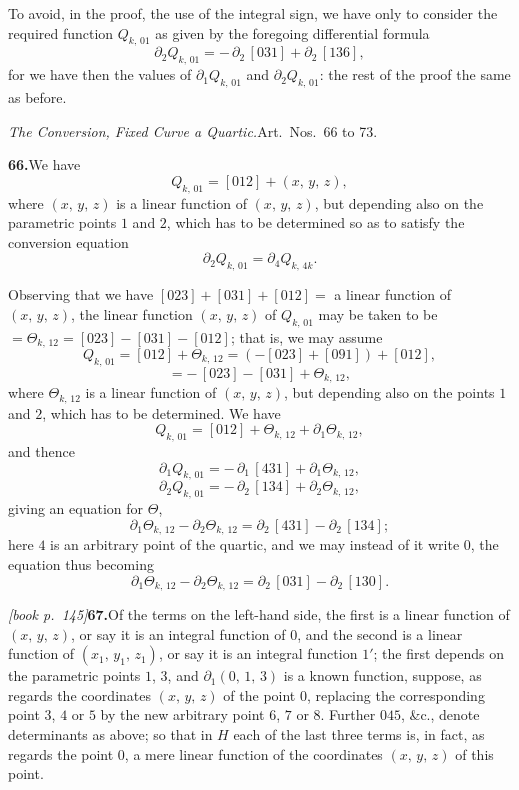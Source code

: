 \documentclass[11pt,a4paper]{article}
\theoremstyle{plain}
\theoremstyle{definition}
\theoremstyle{remark}
\begin{document}
To avoid, in the proof, the use of the integral sign, we have only to consider the required function $Q_{k,\,01}$ as given by the foregoing differential formula
\[
\partial_2 Q_{k,\,01} = -\,\partial_2\,[031] + \partial_2\,[136],
\]
for we have then the values of $\partial_1 Q_{k,\,01}$ and $\partial_2 Q_{k,\,01}$: the rest of the proof the same as before.

\medskip\noindent\textit{The Conversion, Fixed Curve a Quartic.}\quad Art.\ Nos.\ 66 to 73.

\medskip\noindent\textbf{66.}\quad We have
\[
Q_{k,\,01} = [012] + (x,\,y,\,z),
\]
where $(x,\,y,\,z)$ is a linear function of $(x,\,y,\,z)$, but depending also on the parametric points $1$ and $2$, which has to be determined so as to satisfy the conversion equation
\[
\partial_2 Q_{k,\,01} = \partial_4 Q_{k,\,4k}.
\]

Observing that we have $[023] + [031] + [012] = $ a linear function of $(x,\,y,\,z)$, the linear function $(x,\,y,\,z)$ of $Q_{k,\,01}$ may be taken to be $= \Theta_{k,\,12} = [023] - [031] - [012]$; that is, we may assume
\[
Q_{k,\,01} = [012] + \Theta_{k,\,12} = (-[023] + [091]) + [012],
\]
\[
= -\,[023] - [031] + \Theta_{k,\,12},
\]
where $\Theta_{k,\,12}$ is a linear function of $(x,\,y,\,z)$, but depending also on the points $1$ and $2$, which has to be determined. We have
\[
Q_{k,\,01} = [012] + \Theta_{k,\,12} + \partial_1\Theta_{k,\,12},
\]
and thence
\[
\partial_1 Q_{k,\,01} = -\,\partial_1\,[431] + \partial_1\Theta_{k,\,12},
\]
\[
\partial_2 Q_{k,\,01} = -\,\partial_2\,[134] + \partial_2\Theta_{k,\,12},
\]
giving an equation for $\Theta$,
\[
\partial_1\Theta_{k,\,12} - \partial_2\Theta_{k,\,12} = \partial_2\,[431] - \partial_2\,[134];
\]
here $4$ is an arbitrary point of the quartic, and we may instead of it write $0$, the equation thus becoming
\[
\partial_1\Theta_{k,\,12} - \partial_2\Theta_{k,\,12} = \partial_2\,[031] - \partial_2\,[130].
\]

\medskip\noindent\textit{[book p.~145]}\quad \textbf{67.}\quad Of the terms on the left-hand side, the first is a linear function of $(x,\,y,\,z)$, or say it is an integral function of $0$, and the second is a linear function of $(x_1,\,y_1,\,z_1)$, or say it is an integral function $1'$; the first depends on the parametric points $1$, $3$, and $\partial_1(0,\,1,\,3)$ is a known function, suppose, as regards the coordinates $(x,\,y,\,z)$ of the point $0$, replacing the corresponding point $3$, $4$ or $5$ by the new arbitrary point $6$, $7$ or $8$. Further $045$, \&c., denote determinants as above; so that in $H$ each of the last three terms is, in fact, as regards the point $0$, a mere linear function of the coordinates $(x,\,y,\,z)$ of this point.
\end{document}
